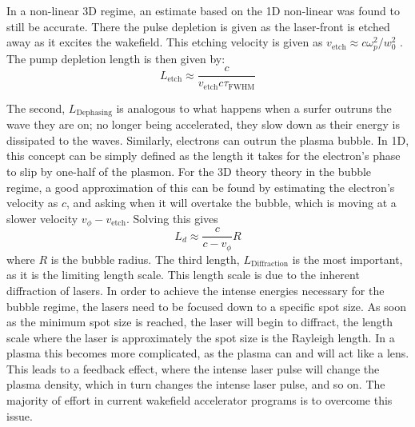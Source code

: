 \documentclass[12pt,letter]{article}
\begin{document}
    In a non-linear 3D regime, an estimate based on the 1D non-linear was
    found to still be accurate. There the pulse depletion is given as the
    laser-front is etched away as it excites the wakefield. This etching
    velocity is given as $v_\textrm{etch}
    \approx c \omega_p^2 /w_0^2$ \cite{deckedevolv}. The pump depletion
    length is then given by:
    \begin{equation}
        L_\textrm{etch} \approx \frac{c}{v_\textrm{etch} c
            \tau_\textrm{FWHM}}
        \end{equation}


    The second, $L_\mathrm{Dephasing}$ is analogous to what happens
    when a surfer outruns the wave they are on; no longer being accelerated,
    they slow down as their energy is dissipated to the waves. Similarly, electrons
    can outrun the plasma bubble. In 1D, this concept can be simply defined
    as the length it takes for the electron's phase to slip by one-half
    of the plasmon. For the 3D theory theory in the bubble regime, a good approximation of this
can be found by estimating the electron's velocity as $c$, and asking
when it will overtake the bubble, which is moving at a slower velocity
$v_\phi-v_\textrm{etch}$. Solving this gives
\begin{equation}
    L_d \approx \frac{c}{c-v_\phi}R
\end{equation}
where $R$ is the bubble radius.
    The third length, $L_\mathrm{Diffraction}$ is the most important, as it is
    the limiting length scale. This length scale is due to the inherent
    diffraction of lasers. In order to achieve the intense energies necessary
    for the bubble regime, the lasers need to be focused down to a specific spot
    size. As soon as the minimum spot size is reached, the laser will begin to
    diffract, the length scale where the laser is approximately the spot size is
    the Rayleigh length. In a plasma this becomes more complicated, as the
    plasma can and will act like a lens. This leads to a feedback effect, where
    the intense laser pulse will change the plasma density, which in turn
    changes the intense laser pulse, and so on. The majority of effort in current wakefield accelerator  programs is to overcome this issue.
\end{document}
